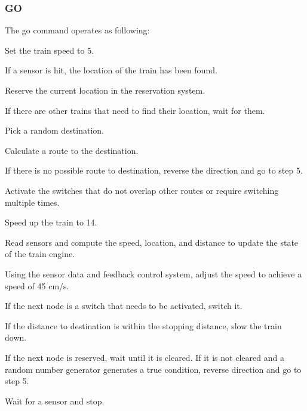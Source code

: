 \documentclass[letterpaper]{article}
\begin{document}
\subsubsection{GO%
  \label{go}%
}

The go command operates as following:
\setcounter{listcnt0}{0}
\begin{list}{.}
{
\setlength{\rightmargin}{\leftmargin}
}

\item Set the train speed to 5.

\item If a sensor is hit, the location of the train has been found.

\item Reserve the current location in the reservation system.

\item If there are other trains that need to find their location, wait for them.

\item Pick a random destination.

\item Calculate a route to the destination.

\item If there is no possible route to destination, reverse the direction and go to step 5.

\item Activate the switches that do not overlap other routes or require switching multiple times.

\item Speed up the train to 14.

\item Read sensors and compute the speed, location, and distance to update the state of the train engine.

\item Using the sensor data and  feedback control system, adjust the speed to achieve a speed of 45 cm/s.

\item If the next node is a switch that needs to be activated, switch it.

\item If the distance to destination is within the stopping distance, slow the train down.

\item If the next node is reserved, wait until it is cleared. If it is not cleared and a random number generator generates a true condition, reverse direction and go to step 5.

\item Wait for a sensor and stop.
\end{list}
\end{document}
